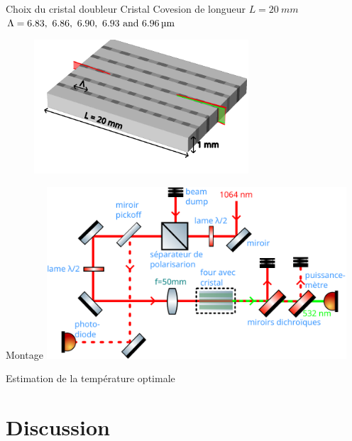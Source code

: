 \documentclass{beamer}
\newcommand{\lmbd}[1]{\SI{#1}{\nano\metre}}
\begin{document}
\begin{frame}{Choix du cristal doubleur}
Cristal Covesion de longueur $L=\SI{20}{mm}$ \\
$\Lambda = \qtylist[list-units = single]{6.83; 6.86 ; 6.90 ; 6.93 ; 6,96}{\micro\meter}$
\begin{figure}
\centering
\includegraphics[height=5cm]{img/cristal2.pdf} %
\end{figure}
\end{frame}

\begin{frame}{Montage}
\centering
\includegraphics[height=6.4cm]{img/schema.pdf}
\end{frame}

\begin{frame}{Estimation de la température optimale}
\centering


\end{frame}

\section{Discussion}
\end{document}
